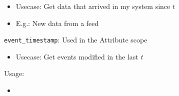 \begin{multicols*}{2}
{\begin{description}[noitemsep,topsep=2pt,parsep=0pt,partopsep=0pt]
\begin{itemize}[noitemsep,topsep=2pt,parsep=0pt,partopsep=0pt]
                \item Usecase: Get data that arrived in my system since $t$
                \item E.g.: New data from a feed
            \end{itemize}
            \item \texttt{event\_timestamp}: Used in the Attribute scope
                \begin{itemize}[noitemsep,topsep=2pt,parsep=0pt,partopsep=0pt]
                    \item Usecase: Get events modified in the last $t$
                \end{itemize}
            \item Usage:
            \begin{itemize}[noitemsep,topsep=0pt,parsep=0pt,partopsep=0pt]
                \item[] \usebox\codeboxD
            \end{itemize}
        \end{description}
    }



\end{multicols*}
